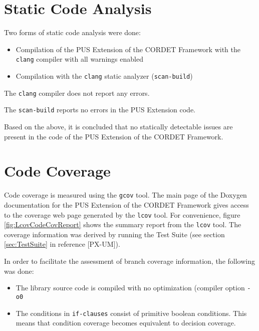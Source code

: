 \documentclass{pnp_article}
\begin{document}
\section{Static Code Analysis}\label{sec:svrStaticCodeAna}
Two forms of static code analysis were done:

\begin{itemize}
\item Compilation of the PUS Extension of the CORDET Framework with the \texttt{clang} compiler with all warnings enabled
\item Compilation with the \texttt{clang} static analyzer (\texttt{scan-build})
\end{itemize}

The \texttt{clang} compiler does not report any errors.

The \texttt{scan-build} reports no errors in the PUS Extension code.

Based on the above, it is concluded that no statically detectable issues are present in the code of the PUS Extension of the CORDET Framework.







\section{Code Coverage}\label{sec:svrCodeCov}
Code coverage is measured using the \texttt{gcov} tool. The main page of the Doxygen documentation for the PUS Extension of the CORDET Framework gives access to the coverage web page generated by the \texttt{lcov} tool. For convenience, figure \ref{fig:LcovCodeCovReport} shows the summary report from the \texttt{lcov} tool. The coverage information was derived by running the Test Suite (see section \ref{sec:TestSuite} in reference [PX-UM]).

In order to facilitate the assessment of branch coverage information, the following was done:

\begin{itemize}
\item The library source code is compiled with no optimization (compiler option \texttt{-o0}
\item The conditions in \texttt{if-clauses} consist of primitive boolean conditions. This means that condition coverage becomes equivalent to decision coverage.
\end{itemize}  
\end{document}

